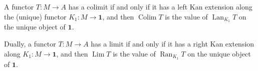 A functor $T: M \to A$ has a colimit if and only if it has a left Kan extension along the (unique) functor $K_1: M \to \mathbf{1}$, and then $\operatorname{Colim} T$ is the value of $\operatorname{Lan}_{K_1} T$ on the unique object of $\mathbf{1}$.

Dually, a functor $T: M \to A$ has a limit if and only if it has a right Kan extension along $K_1: M \to \mathbf{1}$, and then $\operatorname{Lim} T$ is the value of $\operatorname{Ran}_{K_1} T$ on the unique object of $\mathbf{1}$.
